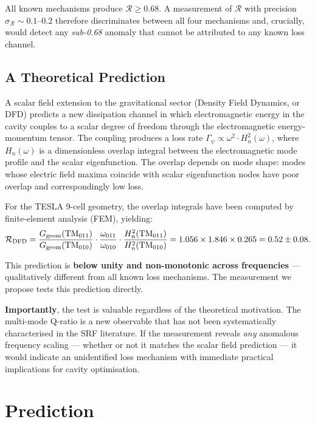 \documentclass[11pt]{article}
\newcommand{\Rq}{\mathcal{R}}
\newcommand{\Heff}{H_n}
\begin{document}
All known mechanisms produce $\Rq \geq 0.68$. A measurement of
$\Rq$ with precision $\sigma_{\Rq} \sim 0.1$--$0.2$ therefore
discriminates between all four mechanisms and, crucially, would
detect any \emph{sub-0.68} anomaly that cannot be attributed to
any known loss channel.

\subsection{A Theoretical Prediction}

A scalar field extension to the gravitational sector (Density Field
Dynamics, or DFD) predicts a new dissipation channel in which
electromagnetic energy in the cavity couples to a scalar degree of
freedom through the electromagnetic energy-momentum tensor. The
coupling produces a loss rate $\Gamma_\psi \propto \omega^2 \cdot
\Heff^2(\omega)$, where $\Heff(\omega)$ is a dimensionless overlap
integral between the electromagnetic mode profile and the scalar
eigenfunction. The overlap depends on mode shape: modes whose electric
field maxima coincide with scalar eigenfunction nodes have poor overlap
and correspondingly low loss.

For the TESLA 9-cell geometry, the overlap integrals have been computed
by finite-element analysis (FEM), yielding:
\begin{equation}
\Rq_{\rm DFD} = \frac{G_{\rm geom}({\rm TM}_{011})}{G_{\rm geom}({\rm TM}_{010})}
\cdot \frac{\omega_{011}}{\omega_{010}}
\cdot \frac{\Heff^2({\rm TM}_{011})}{\Heff^2({\rm TM}_{010})}
= 1.056 \times 1.846 \times 0.265
= 0.52 \pm 0.08.
\label{eq:R-DFD}
\end{equation}

This prediction is \textbf{below unity and non-monotonic across
frequencies} --- qualitatively different from all known loss mechanisms.
The measurement we propose tests this prediction directly.

\textbf{Importantly}, the test is valuable regardless of the
theoretical motivation. The multi-mode Q-ratio is a new observable
that has not been systematically characterised in the SRF literature.
If the measurement reveals \emph{any} anomalous frequency scaling ---
whether or not it matches the scalar field prediction --- it would
indicate an unidentified loss mechanism with immediate practical
implications for cavity optimisation.


\section{Prediction}
\label{sec:prediction}
\end{document}
